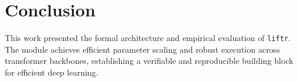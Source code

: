 \section{Conclusion}
This work presented the formal architecture and empirical evaluation of \texttt{liftr}. The module achieves efficient parameter scaling and robust execution across transformer backbones, establishing a verifiable and reproducible building block for efficient deep learning.
